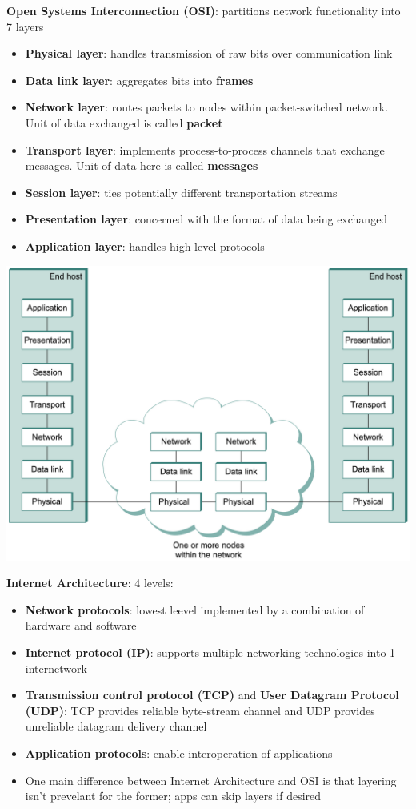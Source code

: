 \documentclass{article}
\begin{document}
  \textbf{Open Systems Interconnection (OSI)}: partitions network functionality into 7 layers
    \begin{itemize}
      \item \textbf{Physical layer}: handles transmission of raw bits over communication link
      \item \textbf{Data link layer}: aggregates bits into \textbf{frames}
      \item \textbf{Network layer}: routes packets to nodes within packet-switched network. Unit of data exchanged is called \textbf{packet}
      \item \textbf{Transport layer}: implements process-to-process channels that exchange messages. Unit of data here is called \textbf{messages}
      \item \textbf{Session layer}: ties potentially different transportation streams
      \item \textbf{Presentation layer}: concerned with the format of data being exchanged
      \item \textbf{Application layer}: handles high level protocols
    \end{itemize}
  \begin{center}
    \includegraphics[scale=0.25]{OSI}
  \end{center}
  \textbf{Internet Architecture}: 4 levels:
    \begin{itemize}
      \item \textbf{Network protocols}: lowest leevel implemented by a combination of hardware and software
      \item \textbf{Internet protocol (IP)}: supports multiple networking technologies into 1 internetwork
      \item \textbf{Transmission control protocol (TCP)} and \textbf{User Datagram Protocol (UDP)}: TCP provides reliable byte-stream channel and UDP provides unreliable datagram delivery channel
      \item \textbf{Application protocols}: enable interoperation of applications
      \item One main difference between Internet Architecture and OSI is that layering isn't prevelant for the former; apps can skip layers if desired
    \end{itemize}
\end{document}
